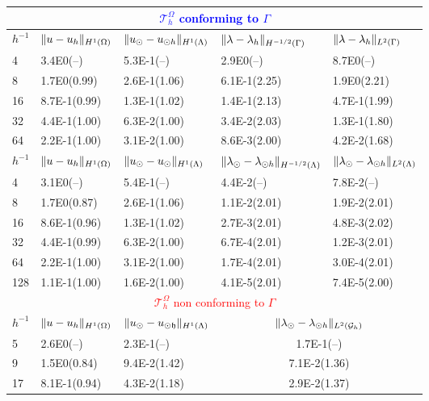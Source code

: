 \documentclass[r]{siamart171218}
\begin{document}
\begin{table}
  \scriptsize{
  \begin{center}
    \begin{tabular}{l|llll}
\hline
\multicolumn{5}{c}{\textcolor{blue}{$\mathcal{T}^{\Omega}_h$ conforming to $\Gamma$}}\\
\hline
    $h^{-1}$ & $\lVert{u-u_h}\rVert_{H^1(\Omega)}$ & $\lVert{u_{\odot}-u_{\odot h}}\rVert_{H^1(\Lambda)}$ & $\lVert{\lambda-\lambda_h}\rVert_{H^{-1/2}(\Gamma)}$ & $\lVert{\lambda-\lambda_h}\rVert_{L^2(\Gamma)}$\\
      \hline
4  & 3.4E0(--)    & 5.3E-1(--)   & 2.9E0(--)    &8.7E0(--)    \\
8  & 1.7E0(0.99)  & 2.6E-1(1.06) & 6.1E-1(2.25) &1.9E0(2.21)  \\
16 & 8.7E-1(0.99) & 1.3E-1(1.02) & 1.4E-1(2.13) &4.7E-1(1.99) \\
32 & 4.4E-1(1.00) & 6.3E-2(1.00) & 3.4E-2(2.03) &1.3E-1(1.80) \\
64 & 2.2E-1(1.00) & 3.1E-2(1.00) & 8.6E-3(2.00) &4.2E-2(1.68) \\
\hline
$h^{-1}$ & $\lVert{u-u_h}\rVert_{H^1(\Omega)}$ & $\lVert{u_{\odot}-u_{\odot}}\rVert_{H^1(\Lambda)}$ & $\lVert{\lambda_{\odot}-\lambda_{\odot h}}\rVert_{H^{-1/2}(\Lambda)}$ & $\lVert{\lambda_{\odot}-\lambda_{\odot h}}\rVert_{L^2(\Lambda)}$\\
\hline
4   & 3.1E0(--)    & 5.4E-1(--)   & 4.4E-2(--)   & 7.8E-2(--)  \\
8   & 1.7E0(0.87)  & 2.6E-1(1.06) & 1.1E-2(2.01) & 1.9E-2(2.01)\\
16  & 8.6E-1(0.96) & 1.3E-1(1.02) & 2.7E-3(2.01) & 4.8E-3(2.02)\\
32  & 4.4E-1(0.99) & 6.3E-2(1.00) & 6.7E-4(2.01) & 1.2E-3(2.01)\\
64  & 2.2E-1(1.00) & 3.1E-2(1.00) & 1.7E-4(2.01) & 3.0E-4(2.01)\\
128 & 1.1E-1(1.00) & 1.6E-2(1.00) & 4.1E-5(2.01) & 7.4E-5(2.00)\\
\hline
\multicolumn{5}{c}{\textcolor{red}{$\mathcal{T}^{\Omega}_h$ non conforming to $\Gamma$}}\\
\hline
    $h^{-1}$ & $\lVert{u-u_h}\rVert_{H^1(\Omega)}$ & $\lVert{u_{\odot}-u_{\odot\mathfrak{h}}}\rVert_{H^1(\Lambda)}$ & \multicolumn{2}{c}{$\lVert{\lambda_{\odot}-\lambda_{\odot h}}\rVert_{L^2(\mathcal{G}_h)}$}\\
      \hline
5   & 2.6E0(--)    & 2.3E-1(--)   & \multicolumn{2}{c}{1.7E-1(--)} \\ 
9   & 1.5E0(0.84)  & 9.4E-2(1.42) & \multicolumn{2}{c}{7.1E-2(1.36)}\\
17  & 8.1E-1(0.94) & 4.3E-2(1.18) & \multicolumn{2}{c}{2.9E-2(1.37)}\\

\end{tabular}
\end{center}}
\end{table}
\end{document}
